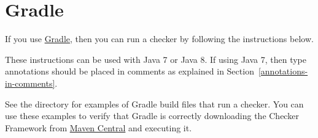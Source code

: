 \section{Gradle\label{gradle}}

If you use \href{http://gradle.org/}{Gradle},
then you can run a checker by following the instructions below.

These instructions can be used with Java 7 or Java 8.  If using Java 7, then
type annotations should be placed in comments as explained in
Section~\ref{annotations-in-comments}.

See the directory  for examples of Gradle
build files that run a checker.  You can use these examples to verify that
Gradle is correctly downloading the Checker Framework from
\href{http://search.maven.org/#search\%7Cga\%7C1\%7Corg.checkerframework}{Maven
  Central} and executing it.

